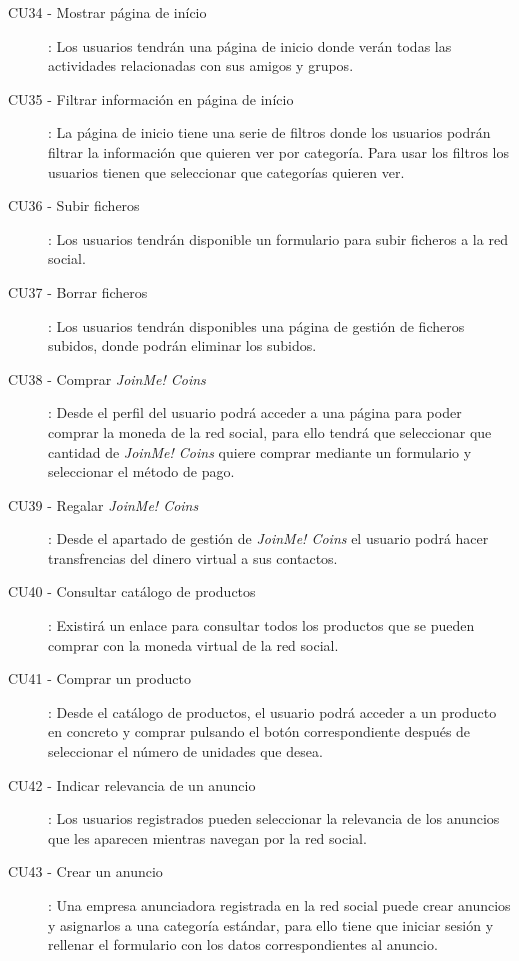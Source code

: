 \documentclass[12pt, a4paper, titlepage]{article}
\begin{document}
\begin{description}
	\item [CU34 - Mostrar página de início]: Los usuarios tendrán una página de inicio donde verán todas las actividades relacionadas con sus amigos y grupos.
	
	\item [CU35 - Filtrar información en página de início]: La página de inicio tiene una serie de filtros donde los usuarios podrán filtrar la información que quieren ver por categoría. Para usar los filtros los usuarios tienen que seleccionar que categorías quieren ver.
	
	\item [CU36 - Subir ficheros]: Los usuarios tendrán disponible un formulario para subir ficheros a la red social.
	
	\item [CU37 - Borrar ficheros]: Los usuarios tendrán disponibles una página de gestión de ficheros subidos, donde podrán eliminar los subidos.
	
	\item [CU38 - Comprar \textit{JoinMe! Coins}]: Desde el perfil del usuario podrá acceder a una página para poder comprar la moneda de la red social, para ello tendrá que seleccionar que cantidad de \textit{JoinMe! Coins} quiere comprar mediante un formulario y seleccionar el método de pago.
	
	\item [CU39 - Regalar \textit{JoinMe! Coins}]: Desde el apartado de gestión de \textit{JoinMe! Coins} el usuario podrá hacer transfrencias del dinero virtual a sus contactos.
	
	\item [CU40 - Consultar catálogo de productos]: Existirá un enlace para consultar todos los productos que se pueden comprar con la moneda virtual de la red social.
		
	\item [CU41 - Comprar un producto]: Desde el catálogo de productos, el usuario podrá acceder a un producto en concreto y comprar pulsando el botón correspondiente después de seleccionar el número de unidades que desea.
	
	\item [CU42 - Indicar relevancia de un anuncio]: Los usuarios registrados pueden seleccionar la relevancia de los anuncios que les aparecen mientras navegan por la red social.
	
	\item [CU43 - Crear un anuncio]: Una empresa anunciadora registrada en la red social puede crear anuncios y asignarlos a una categoría estándar, para ello tiene que iniciar sesión y rellenar el formulario con los datos correspondientes al anuncio.
	

\end{description}
\end{document}
